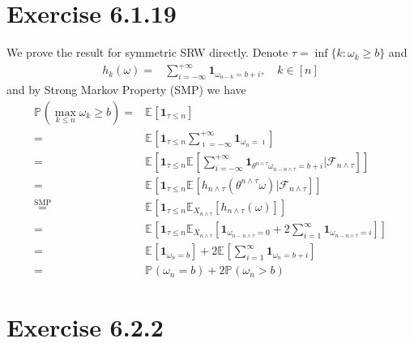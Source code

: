 \documentclass[11pt,a4paper]{ctexart}
\numberwithin{equation}{section}%
\newcommand{\F}{\mathcal{F}}
\begin{document}
\section{Exercise 6.1.19}
We prove the result for symmetric SRW directly. Denote $ \tau  = \inf\{ k: \omega _k \geq b\} $ and 
\begin{align*}
    h_k(\omega )=& \sum_{i=-\infty}^{+\infty} \mathbf{1}_{\omega _{n-k} = b+i} ,\quad k\in [n]
\end{align*}
and by Strong Markov Property (SMP) we have
\begin{align*}
     \mathbb{P}_{  }\left( \max _{k\leq n} \omega _k \geq b \right) =& \mathbb{E}_{  }\left[ \mathbf{1}_{ \tau \leq n} \right]\\
     =& \mathbb{E}_{  }\left[ \mathbf{1}_{ \tau \leq n}\sum_{\imath = -\infty}^{+\infty}\mathbf{1}_{\omega _n = \imath} \right] \\
     =& \mathbb{E}_{  }\left[ \mathbf{1}_{ \tau \leq n} \mathbb{E}_{  }\left[ \sum_{i=-\infty}^{+\infty} \mathbf{1}_{\theta ^{n\wedge\tau} \omega _{n-n\wedge\tau} = b+i} | \F_{n\wedge\tau} \right]   \right]\\
    =& \mathbb{E}_{  }\left[ \mathbf{1}_{ \tau \leq n} \mathbb{E}_{  }\left[ h_{n\wedge\tau}(\theta ^{n\wedge\tau} \omega ) | \F_{n\wedge\tau} \right]   \right]\\
    \mathop{ = }\limits^{\text{SMP}} & \mathbb{E}_{  }\left[ \mathbf{1}_{ \tau \leq n} \mathbb{E}_{ X_{n\wedge\tau} }\left[ h_{n\wedge\tau}(\omega ) \right]   \right]\\
    =& \mathbb{E}_{  }\left[ \mathbf{1}_{ \tau \leq n} \mathbb{E}_{ X_{n\wedge\tau} }\left[ \mathbf{1}_{\omega _{n-n\wedge\tau} = 0}+ 2\sum_{i=1}^\infty\mathbf{1}_{\omega _{n-n\wedge \tau} = i} \right]   \right]\\
    =& \mathbb{E}_{  }\left[ \mathbf{1}_{ \omega _n = b } \right] + 2\mathbb{E}_{  }\left[  \sum_{i=1}^\infty\mathbf{1}_{\omega _n = b+i} \right]\\
    =& \mathbb{P}_{  }\left(\omega _n = b \right) +  2\mathbb{P}_{  }\left( \omega _n > b \right) 
\end{align*}



\section{Exercise 6.2.2}

\subsection{}
\end{document}
